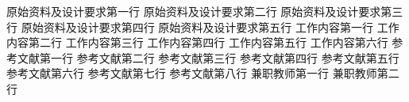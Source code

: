 \assignReq
{原始资料及设计要求第一行}
{原始资料及设计要求第二行}
{原始资料及设计要求第三行}
{原始资料及设计要求第四行}
{原始资料及设计要求第五行}
\assignWork
{工作内容第一行}
{工作内容第二行}
{工作内容第三行}
{工作内容第四行}
{工作内容第五行}
{工作内容第六行}
\assignRef
{参考文献第一行}
{参考文献第二行}
{参考文献第三行}
{参考文献第四行}
{参考文献第五行}
{参考文献第六行}
{参考文献第七行}
{参考文献第八行}
\assignPartutor
{兼职教师第一行}
{兼职教师第二行}
